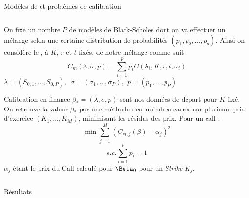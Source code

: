 \documentclass[final]{beamer}
\newlength{\onecolwid}
\newlength{\twocolwid}
\begin{document}
\begin{frame}[t]
\begin{columns}[t]
\begin{column}{\twocolwid}
\begin{block}{Modèles de  et problèmes de calibration}
\begin{columns}[t,totalwidth=\twocolwid]
\begin{column}{\onecolwid}

  On fixe un nombre $P$ de modèles de Black-Scholes dont on va effectuer un mélange selon une certaine distribution de probabilités $(p_1,p_2,...,p_p)$.
  \newline
  Ainsi on considère le , à $K$, $r$ et $t$ fixés, de notre mélange comme suit :
  $$ C_m(\lambda, \sigma, p) = \sum^p_{i=1} p_i C(\lambda_i,K,r,t,\sigma_i) $$
\vspace{-0.3cm}
$\lambda = (S_{0,1},...,S_{0,P}),\ \  \sigma = (\sigma_1,...,\sigma_P), \ \ p = (p_1,...,p_P)$
\vspace{0.3cm}
\begin{alertblock}{Calibration en finance}
  $ \beta_* = (\lambda,\sigma,p)$ sont nos données de départ pour $K$ fixé.
  \newline
  On retrouve la valeur $\beta_*$ par une méthode des moindres carrés sur plusieurs prix d'exercice $(K_1,...,K_M)$, minimisant les résidus des prix. \newline
  Pour un call :
  $$ \min \sum^M_{j=1} (C_{m,j}(\beta)-\alpha_j)^2 $$
  \vspace{-0.4cm}
  $$ s.c. \sum^p_{i=1}p_i = 1 $$
$\alpha_j$ étant le prix du Call calculé pour $\Beta_0$ pour un \textit{Strike} $K_j$.
\end{alertblock}
\end{column} %

\end{columns} %

\end{block}


\vspace{0cm}
\begin{block}{Résultats}


\begin{columns}[t,totalwidth=0.45\paperwidth] %


\end{columns}
\end{block}
\end{column}
\end{columns}
\end{frame}
\end{document}
